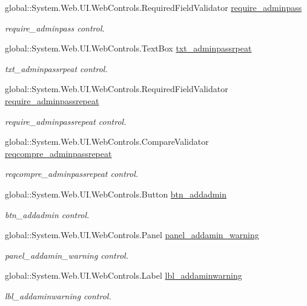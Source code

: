 \begin{DoxyCompactItemize}
global\+::\+System.\+Web.\+U\+I.\+Web\+Controls.\+Required\+Field\+Validator \mbox{\hyperlink{class_admin__add_admin_a42e8c229b422bff672c6f07451d7508b}{require\+\_\+adminpass}}
\begin{DoxyCompactList}\small\item\em require\+\_\+adminpass control. \end{DoxyCompactList}\item 
global\+::\+System.\+Web.\+U\+I.\+Web\+Controls.\+Text\+Box \mbox{\hyperlink{class_admin__add_admin_a9fa301b44ec7de5fa293d1ae4bfce10b}{txt\+\_\+adminpassrpeat}}
\begin{DoxyCompactList}\small\item\em txt\+\_\+adminpassrpeat control. \end{DoxyCompactList}\item 
global\+::\+System.\+Web.\+U\+I.\+Web\+Controls.\+Required\+Field\+Validator \mbox{\hyperlink{class_admin__add_admin_acf38038b136b99be08e9294e94dc2bf7}{require\+\_\+adminpassrepeat}}
\begin{DoxyCompactList}\small\item\em require\+\_\+adminpassrepeat control. \end{DoxyCompactList}\item 
global\+::\+System.\+Web.\+U\+I.\+Web\+Controls.\+Compare\+Validator \mbox{\hyperlink{class_admin__add_admin_afa70dac6852d8bd87362de69600ddd65}{reqcompre\+\_\+adminpassrepeat}}
\begin{DoxyCompactList}\small\item\em reqcompre\+\_\+adminpassrepeat control. \end{DoxyCompactList}\item 
global\+::\+System.\+Web.\+U\+I.\+Web\+Controls.\+Button \mbox{\hyperlink{class_admin__add_admin_a8fa0b8bb4680b899f4ee2f1bfc5fa159}{btn\+\_\+addadmin}}
\begin{DoxyCompactList}\small\item\em btn\+\_\+addadmin control. \end{DoxyCompactList}\item 
global\+::\+System.\+Web.\+U\+I.\+Web\+Controls.\+Panel \mbox{\hyperlink{class_admin__add_admin_adf8dd956c7551881f6908b431665e0a5}{panel\+\_\+addamin\+\_\+warning}}
\begin{DoxyCompactList}\small\item\em panel\+\_\+addamin\+\_\+warning control. \end{DoxyCompactList}\item 
global\+::\+System.\+Web.\+U\+I.\+Web\+Controls.\+Label \mbox{\hyperlink{class_admin__add_admin_a34cba1e618f49372d9263b9f84e32c3b}{lbl\+\_\+addaminwarning}}
\begin{DoxyCompactList}\small\item\em lbl\+\_\+addaminwarning control. \end{DoxyCompactList}\end{DoxyCompactItemize}


